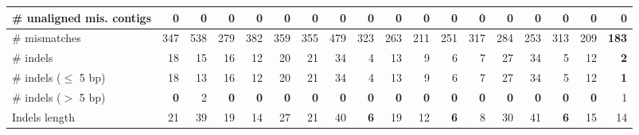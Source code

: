\documentclass[12pt,a4paper]{article}
\begin{document}
\begin{table}[ht]
\begin{center}
\begin{tabular}{|l*{17}{|r}|}
\# unaligned mis. contigs & 0 & 0 & 0 & 0 & 0 & 0 & 0 & 0 & 0 & 0 & 0 & 0 & 0 & 0 & 0 & 0 & 0 \\ \hline
\# mismatches & 347 & 538 & 279 & 382 & 359 & 355 & 479 & 323 & 263 & 211 & 251 & 317 & 284 & 253 & 313 & 209 & {\bf 183} \\ \hline
\# indels & 18 & 15 & 16 & 12 & 20 & 21 & 34 & 4 & 13 & 9 & 6 & 7 & 27 & 34 & 5 & 12 & {\bf 2} \\ \hline
\hspace{5mm}\# indels ($\leq$ 5 bp) & 18 & 13 & 16 & 12 & 20 & 21 & 34 & 4 & 13 & 9 & 6 & 7 & 27 & 34 & 5 & 12 & {\bf 1} \\ \hline
\hspace{5mm}\# indels ($>$ 5 bp) & {\bf 0} & 2 & {\bf 0} & {\bf 0} & {\bf 0} & {\bf 0} & {\bf 0} & {\bf 0} & {\bf 0} & {\bf 0} & {\bf 0} & {\bf 0} & {\bf 0} & {\bf 0} & {\bf 0} & {\bf 0} & 1 \\ \hline
Indels length & 21 & 39 & 19 & 14 & 27 & 21 & 40 & {\bf 6} & 19 & 12 & {\bf 6} & 8 & 30 & 41 & {\bf 6} & 15 & 14 \\ \hline
\end{tabular}
\end{center}
\end{table}
\end{document}
